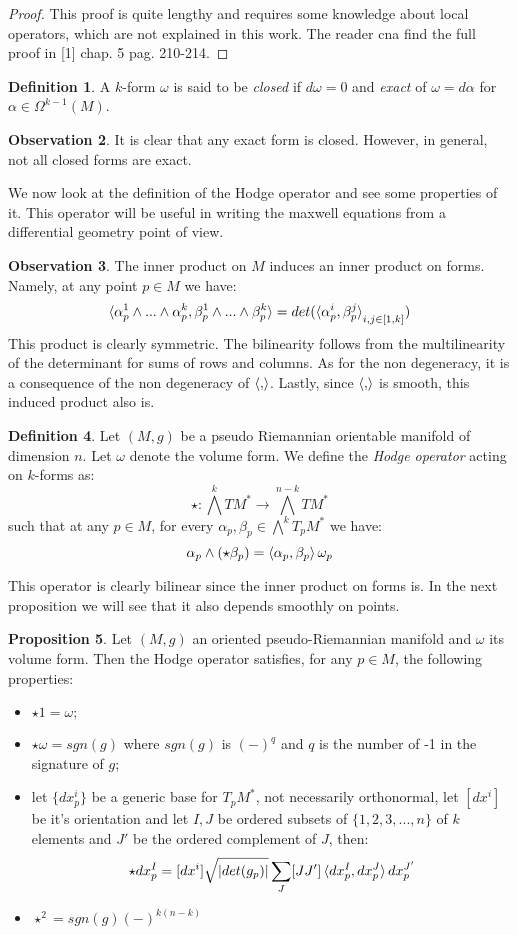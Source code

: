 \documentclass[12pt,a4paper]{report}
\theoremstyle{definition}
\newtheorem{Def}{Definition}[chapter]
\theoremstyle{Theorem}
\newtheorem{Prop}[Def]{Proposition}
\theoremstyle{definition}
\theoremstyle{definition}
\newtheorem{Obs}[Def]{Observation}
\begin{document}
	\begin{proof}
		This proof is quite lengthy and requires some knowledge about local operators, which are not explained in this work. The reader cna find the full proof in [1] chap. 5 pag. 210-214.
	\end{proof}
	\begin{Def}
		A $k$-form $\omega$ is said to be \textit{closed} if $d\omega=0$ and \textit{exact} of $\omega=d\alpha$ for $\alpha\in\Omega^{k-1}(M)$.
	\end{Def}
	\begin{Obs}
		It is clear that any exact form is closed. However, in general, not all closed forms are exact.
	\end{Obs}
	We now look at the definition of the Hodge operator and see some properties of it. This operator will be useful in writing the maxwell equations from a differential geometry point of view.
	\begin{Obs}
		The inner product on $M$ induces an inner product on forms. Namely, at any point $p\in M$ we have:
		$$\braket{\alpha^1_p\wedge...\wedge \alpha^k_p,\beta^1_p\wedge...\wedge\beta^k_p}=det(\braket{\alpha^i_p,\beta^j_p}_{i,j\in[1,k]})$$
		This product is clearly symmetric. The bilinearity follows from the multilinearity of the determinant for sums of rows and columns. As for the non degeneracy, it is a consequence of the non degeneracy of $\braket{,}$. Lastly, since $\braket{,}$ is smooth, this induced product also is.
	\end{Obs}
	\begin{Def}
		Let $(M,g)$ be a pseudo Riemannian orientable manifold of dimension $n$. Let $\omega$ denote the volume form. We define the \textit{Hodge operator} acting on $k$-forms as:
		$$\star:\bigwedge^kTM^*\rightarrow \bigwedge^{n-k}TM^*$$
		such that at any $p\in M$, for every $\alpha_p,\beta_p\in\bigwedge^kT_pM^*$ we have:
		$$\alpha_p\wedge(\star\beta_p)=\braket{\alpha_p,\beta_p}\omega_p$$
	\end{Def}
	This operator is clearly bilinear since the inner product on forms is. In the next proposition we will see that it also depends smoothly on points.
	\begin{Prop}
		Let $(M,g)$ an oriented pseudo-Riemannian manifold and $\omega$ its volume form. Then the Hodge operator satisfies, for any $p\in M$, the following properties:
		\begin{itemize}
			\item $\star 1=\omega;$
			\item $\star\omega=sgn(g)$ where $sgn(g)$ is $(-)^q$ and $q$ is the number of -1 in the signature of $g$;
			\item let $\{dx^i_p\}$ be a generic base for $T_pM^*$, not necessarily orthonormal, let $[dx^i]$ be it's orientation and let $I,J$ be ordered subsets of $\{1,2,3,...,n\}$ of $k$ elements and $J'$ be the ordered complement of $J$, then:
			$$\star dx_p^I=[dx^i]\sqrt{|det(g_p)|}\sum_J[JJ']\braket{dx_p^I,dx_p^J}dx_p^{J'}$$
			\item $\star^2=sgn(g)(-)^{k(n-k)}$
		\end{itemize}
	\end{Prop}
\end{document}
